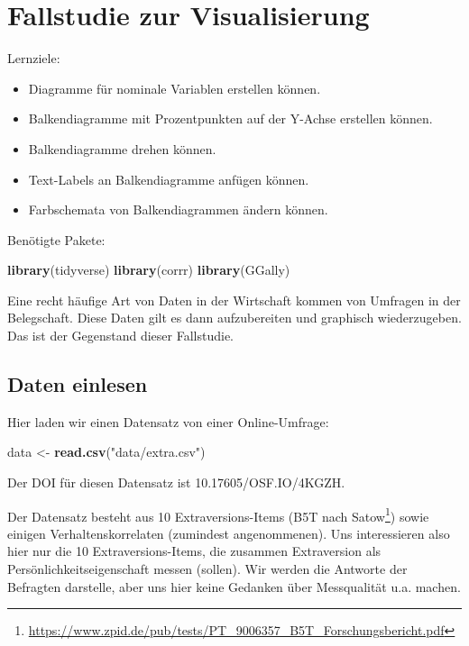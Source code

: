 \documentclass[12pt,ngerman,]{book}
\makeatletter
\newenvironment{Shaded}{\begin{snugshade}}{\end{snugshade}}
\newcommand{\KeywordTok}[1]{\textcolor[rgb]{0.13,0.29,0.53}{\textbf{{#1}}}}
\newcommand{\StringTok}[1]{\textcolor[rgb]{0.31,0.60,0.02}{{#1}}}
\newcommand{\NormalTok}[1]{{#1}}
\providecommand{\tightlist}{%
  \setlength{\itemsep}{0pt}\setlength{\parskip}{0pt}}
\let\rmarkdownfootnote\footnote%
\def\footnote{\protect\rmarkdownfootnote}
\newenvironment{kframe}{%
\medskip{}
\setlength{\fboxsep}{.8em}
 \def\at@end@of@kframe{}%
 \ifinner\ifhmode%
  \def\at@end@of@kframe{\end{minipage}}%
  \begin{minipage}{\columnwidth}%
 \fi\fi%
 \def\FrameCommand##1{\hskip\@totalleftmargin \hskip-\fboxsep
 \colorbox{shadecolor}{##1}\hskip-\fboxsep
     \hskip-\linewidth \hskip-\@totalleftmargin \hskip\columnwidth}%
 \MakeFramed {\advance\hsize-\width
   \@totalleftmargin\z@ \linewidth\hsize
   \@setminipage}}%
 {\par\unskip\endMakeFramed%
 \at@end@of@kframe}
\renewenvironment{Shaded}{\begin{kframe}}{\end{kframe}}
\let\BeginKnitrBlock\begin \let\EndKnitrBlock\end
\makeatother
\begin{document}
\chapter{Fallstudie zur
Visualisierung}\label{fallstudie-zur-visualisierung}

\BeginKnitrBlock{rmdcaution}
Lernziele:

\begin{itemize}
\tightlist
\item
  Diagramme für nominale Variablen erstellen können.
\item
  Balkendiagramme mit Prozentpunkten auf der Y-Achse erstellen können.
\item
  Balkendiagramme drehen können.
\item
  Text-Labels an Balkendiagramme anfügen können.
\item
  Farbschemata von Balkendiagrammen ändern können.
\end{itemize}
\EndKnitrBlock{rmdcaution}

Benötigte Pakete:

\begin{Shaded}
\begin{Highlighting}[]
\KeywordTok{library}\NormalTok{(tidyverse)}
\KeywordTok{library}\NormalTok{(corrr)}
\KeywordTok{library}\NormalTok{(GGally)}
\end{Highlighting}
\end{Shaded}

Eine recht häufige Art von Daten in der Wirtschaft kommen von Umfragen
in der Belegschaft. Diese Daten gilt es dann aufzubereiten und graphisch
wiederzugeben. Das ist der Gegenstand dieser Fallstudie.

\section{Daten einlesen}\label{daten-einlesen-1}

Hier laden wir einen Datensatz von einer Online-Umfrage:

\begin{Shaded}
\begin{Highlighting}[]
\NormalTok{data <-}\StringTok{ }\KeywordTok{read.csv}\NormalTok{(}\StringTok{"data/extra.csv"}\NormalTok{)}
\end{Highlighting}
\end{Shaded}

Der DOI für diesen Datensatz ist 10.17605/OSF.IO/4KGZH.

Der Datensatz besteht aus 10 Extraversions-Items (B5T nach
Satow\footnote{\url{https://www.zpid.de/pub/tests/PT_9006357_B5T_Forschungsbericht.pdf}})
sowie einigen Verhaltenskorrelaten (zumindest angenommenen). Uns
interessieren also hier nur die 10 Extraversions-Items, die zusammen
Extraversion als Persönlichkeitseigenschaft messen (sollen). Wir werden
die Antworte der Befragten darstelle, aber uns hier keine Gedanken über
Messqualität u.a. machen.
\end{document}
